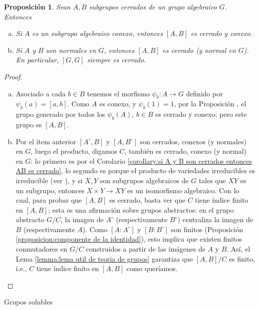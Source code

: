 \documentclass[spanish,12pt]{amsart}
\makeatletter
\renewcommand\subsection{\@startsection{subsection}{2}%
  \z@{.5\linespacing\@plus.7\linespacing}{-.5em}%
  {\normalfont\sffamily}}
\newtheorem{proposition}[theorem]{Proposición}
\theoremstyle{definition}
\theoremstyle{remark}
\numberwithin{equation}{section}
\makeatother
\begin{document}
\begin{proposition}\label{proposition: el conmutador de conexo es conexo}
Sean $A,B$ subgrupos cerrados de un grupo algebraico $G$. Entonces
\begin{enumerate}[(a)]
\item Si $A$ es un subgrupo algebraico conexo, entonces $[A,B]$ es cerrado y conexo.
\item Si $A$ y $B$ son normales en $G$, entonces $[A,B]$ es cerrado (y normal en $G$). En particular, $[G,G]$ siempre es cerrado.
\end{enumerate}
\end{proposition}
\begin{proof}
\begin{enumerate}[(a)]
\item Asociado a cada $b \in B$ tenemos el morfismo $\psi_b : A \to G$ definido por $\psi_b (a) = [a,b]$. Como $A$ es conexo, y $\psi_b (1) = 1$, por la Proposición \cite[7.5]{humphreys2012linearAlgebraicGroups}, el grupo generado por todos los $\psi_b (A)$, $b \in B$ es cerrado y conexo; pero este grupo es $[A,B]$.
\item Por el ítem anterior $[A^\circ, B]$ y $[A, B^\circ]$ son cerrados, conexos (y normales) en $G$, luego el producto, digamos $C$, también es cerrado, conexo (y normal) en $G$: lo primero es por el Corolario \ref{corollary:si A y B son cerrados entonces AB es cerrado}, lo segundo es porque el producto de variedades irreducibles es irreducible (ver \cite[Proposición 2.8.5]{notas_pedro}), y si $X,Y$ son subgrupos algebraicos de $G$ tales que $XY$ es un subgrupo, entonces $X \times Y \to XY$ es un isomorfismo algebraico. Con lo cual, para probar que $[A,B]$ es cerrado, basta ver que $C$ tiene índice finito en $[A,B]$; esta es una afirmación sobre grupos abstractos: en el grupo abstracto $G/C$, la imagen de $A^\circ$ (respectivamente $B^\circ$) centraliza la imagen de $B$ (respectivamente $A$). Como $[A : A^\circ]$ y $[B: B^\circ]$ son finitos (Proposición \ref{proposicion:componente de la identidad}), esto implica que existen finitos conmutadores en $G/C$ construidos a partir de las imágenes de $A$ y $B$. Así, el Lema \ref{lemma:lema util de teoria de grupos} garantiza que $[A,B]/C$ es finito, i.e., $C$ tiene índice finito en $[A,B]$ como queríamos.
\end{enumerate}
\end{proof}


\subsection{Grupos solubles}
\end{document}
